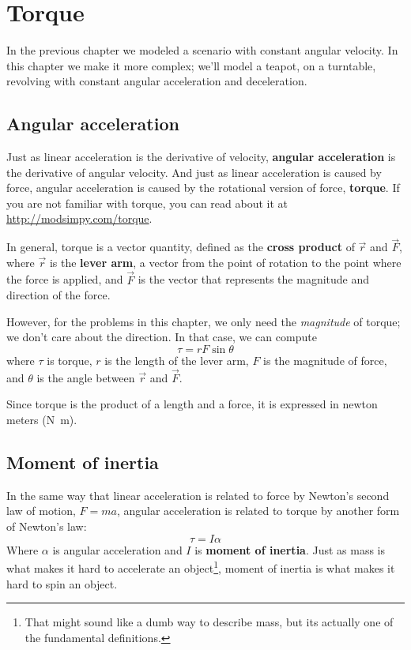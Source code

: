 \documentclass[12pt]{book}
\theoremstyle{exercise}
\begin{document}
\chapter{Torque}
\label{chap25}

In the previous chapter we modeled a scenario with constant angular velocity.  In this chapter we make it more complex; we'll model a teapot, on a turntable, revolving with constant angular acceleration and deceleration.

\section{Angular acceleration}


Just as linear acceleration is the derivative of velocity, {\bf angular acceleration} is the derivative of angular velocity.  And just as linear acceleration is caused by force, angular acceleration is caused by the rotational version of force, {\bf torque}.  If you are not familiar with torque, you can read about it at \url{http://modsimpy.com/torque}.

In general, torque is a vector quantity, defined as the {\bf cross product} of $\vec{r}$ and $\vec{F}$, where $\vec{r}$ is the {\bf lever arm}, a vector from the point of rotation to the point where the force is applied, and $\vec{F}$ is the vector that represents the magnitude and direction of the force.


However, for the problems in this chapter, we only need the {\em magnitude} of torque; we don't care about the direction.  In that case, we can compute
%
\[ \tau = r F \sin \theta \]
%
where $\tau$ is torque, $r$ is the length of the lever arm, $F$ is the magnitude of force, and $\theta$ is the angle between $\vec{r}$ and $\vec{F}$.  


Since torque is the product of a length and a force, it is expressed in newton meters (\si{\newton\meter}).


\section{Moment of inertia}

In the same way that linear acceleration is related to force by Newton's second law of motion, $F=ma$, angular acceleration is related to torque by another form of Newton's law:
%
\[ \tau = I \alpha \]
%
Where $\alpha$ is angular acceleration and $I$ is {\bf moment of inertia}.  Just as mass is what makes it hard to accelerate an object\footnote{That might sound like a dumb way to describe mass, but its actually one of the fundamental definitions.}, moment of inertia is what makes it hard to spin an object.
\end{document}

